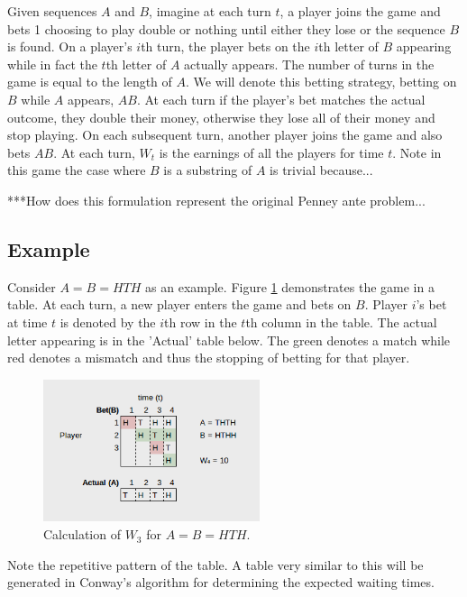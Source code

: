 \documentclass{article}
\numberwithin{mytheorem}{subsection} %
\begin{document}
		    Given sequences $A$ and $B$, imagine at each turn $t$, a player joins the game and bets 1 choosing to play double or nothing until either they lose or the sequence $B$ is found. On a player's $i$th turn, the player bets on the $i$th letter of $B$ appearing while in fact the $t$th letter of $A$ actually appears. The number of turns in the game is equal to the length of $A$. We will denote this betting strategy, betting on $B$ while $A$ appears, $AB$. At each turn if the player's bet matches the actual outcome, they double their money, otherwise they lose all of their money and stop playing. On each subsequent turn, another player joins the game and also bets $AB$. At each turn, $W_t$ is the earnings of all the players for time $t$. Note in this game the case where $B$ is a substring of $A$ is trivial because... \cite{grinstead} 

		    ***How does this formulation represent the original Penney ante problem...

		\subsection{Example}
			Consider $A = B = HTH$ as an example. Figure \ref{fig} demonstrates the game in a table. At each turn, a new player enters the game and bets on $B$. Player $i$'s bet at time $t$ is denoted by the $i$th row in the $t$th column in the table. The actual letter appearing is in the 'Actual' table below. The green denotes a match while red denotes a mismatch and thus the stopping of betting for that player. 
			\begin{figure}[h]
				\begin{center}
					\includegraphics[width=2.5in]{AB}
				\end{center}
			
				\caption{Calculation of $W_3$ for $A = B = HTH$.}
				\label{fig}
			\end{figure}

			Note the repetitive pattern of the table. A table very similar to this will be generated in Conway's algorithm for determining the expected waiting times. 
\end{document}
